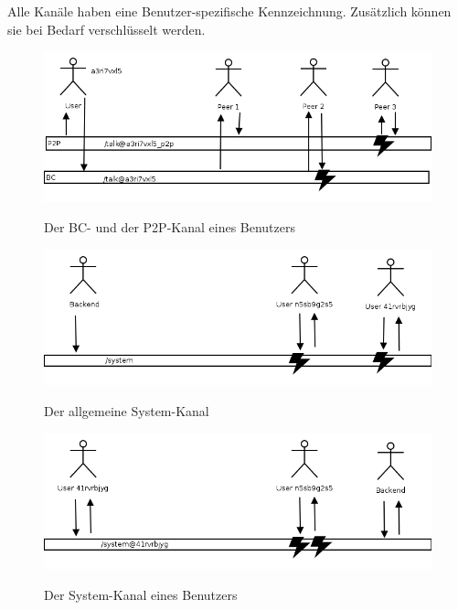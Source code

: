 Alle Kanäle haben eine Benutzer-spezifische Kennzeichnung. Zusätzlich können sie bei Bedarf verschlüsselt werden.

\enlargethispage{3\baselineskip} %

  \begin{figure}[H]
      \centering
	  \includegraphics[scale=0.5]{bilder/ps_infrastructure.png}\\ 
  	  \caption{Der BC- und der P2P-Kanal eines Benutzers}
  \end{figure}

  \begin{figure}[H]
      \centering
	  \includegraphics[scale=0.5]{bilder/ps_infrastructure_sys_bc.png}\\ 
  	  \caption{Der allgemeine System-Kanal}
  \end{figure}

  \begin{figure}[H]
      \centering
	  \includegraphics[scale=0.5]{bilder/ps_infrastructure_2.png}\\ 
  	  \caption{Der System-Kanal eines Benutzers}
  \end{figure}

